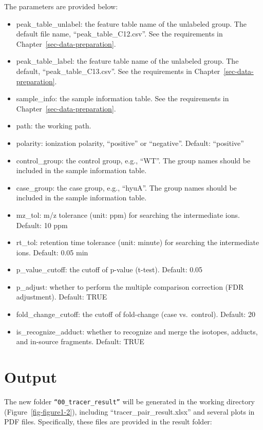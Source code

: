 \documentclass[
  letterpaper,
  DIV=11,
  numbers=noendperiod]{scrreprt}
\providecommand{\tightlist}{%
  \setlength{\itemsep}{0pt}\setlength{\parskip}{0pt}}
\begin{document}
The parameters are provided below:

\begin{itemize}
\tightlist
\item
  peak\_table\_unlabel: the feature table name of the unlabeled group.
  The default file name, ``peak\_table\_C12.csv''. See the requirements
  in Chapter~\ref{sec-data-preparation}.
\item
  peak\_table\_label: the feature table name of the unlabeled group. The
  default, ``peak\_table\_C13.csv''. See the requirements in
  Chapter~\ref{sec-data-preparation}.
\item
  sample\_info: the sample information table. See the requirements in
  Chapter~\ref{sec-data-preparation}.
\item
  path: the working path.
\item
  polarity: ionization polarity, ``positive'' or ``negative''. Default:
  ``positive''
\item
  control\_group: the control group, e.g., ``WT''. The group names
  should be included in the sample information table.
\item
  case\_group: the case group, e.g., ``hyuA''. The group names should be
  included in the sample information table.
\item
  mz\_tol: m/z tolerance (unit: ppm) for searching the intermediate
  ions. Default: 10 ppm
\item
  rt\_tol: retention time tolerance (unit: minute) for searching the
  intermediate ions. Default: 0.05 min
\item
  p\_value\_cutoff: the cutoff of p-value (t-test). Default: 0.05
\item
  p\_adjust: whether to perform the multiple comparison correction (FDR
  adjustment). Default: TRUE
\item
  fold\_change\_cutoff: the cutoff of fold-change (case vs.~control).
  Default: 20
\item
  is\_recognize\_adduct: whether to recognize and merge the isotopes,
  adducts, and in-source fragments. Default: TRUE
\end{itemize}

\section{Output}\label{sec-isoPairFinder-output}

The new folder \texttt{“00\_tracer\_result”} will be generated in the
working directory (Figure~\ref{fig-figure1-2}), including
``tracer\_pair\_result.xlsx'' and several plots in PDF files.
Specifically, these files are provided in the result folder:
\end{document}
